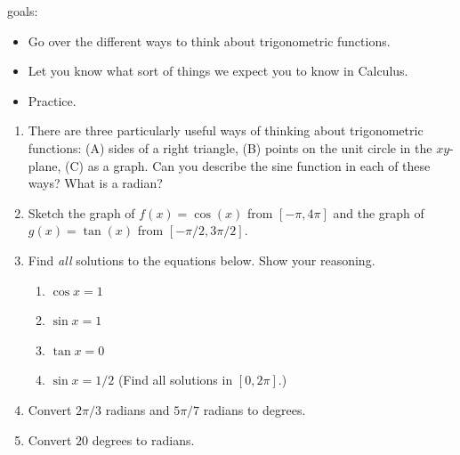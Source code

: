 \documentclass[11pt,fleqn]{article}
\begin{document}
\renewcommand{\headrulewidth}{0pt}
\newcommand{\blank}[1]{\rule{#1}{0.75pt}}
\renewcommand{\d}{\displaystyle}
\vspace*{-0.7in}
\begin{center}
  \large {}
\end{center}
goals:
\begin{itemize}
\item Go over the different ways to think about trigonometric functions.
\item Let you know what sort of things we expect you to know in Calculus.
\item Practice.
\end{itemize}


\begin{enumerate}
\item There are three particularly useful ways of thinking about trigonometric functions: (A) sides of a right triangle, (B) points on the unit circle in the $xy$-plane, (C) as a graph. Can you describe the sine function in each of these ways?
\vfill
What is a radian?\\
\vspace{1in}
\newpage
\item Sketch the graph of $f(x) = \cos (x)$ from $[-\pi, 4 \pi]$ and the graph of $g(x)=\tan(x)$  from $[-\pi/2, 3\pi/2].$
\vfill
\item Find \emph{all} solutions to the equations below. Show your reasoning.
\begin{multicols}{2}
\begin{enumerate}
\item $\cos x =1$
\vspace{.5in}
\item $\sin x =1$
\vspace{1in}
\columnbreak
\item $\tan x = 0$
\vspace{1in}
\item $\sin x = 1/2$ (Find all solutions in $[0,2\pi].$)
\vspace{.5in}
\end{enumerate}
\end{multicols}
\vspace{1.5in}
\newpage
\item Convert $2\pi/3$ radians and $5\pi/7$ radians to degrees.
\vspace{1in}
\item Convert $20$ degrees to radians.
\vspace{1in}

\end{enumerate}
\end{document}
